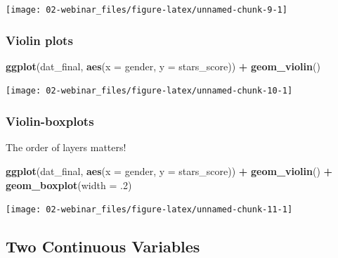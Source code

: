 \documentclass[
  oneside]{book}
\newenvironment{Shaded}{\begin{snugshade}}{\end{snugshade}}
\newcommand{\AttributeTok}[1]{\textcolor[rgb]{0.13,0.29,0.53}{#1}}
\newcommand{\DecValTok}[1]{\textcolor[rgb]{0.00,0.00,0.81}{#1}}
\newcommand{\FunctionTok}[1]{\textcolor[rgb]{0.13,0.29,0.53}{\textbf{#1}}}
\newcommand{\NormalTok}[1]{#1}
\newcommand{\SpecialCharTok}[1]{\textcolor[rgb]{0.81,0.36,0.00}{\textbf{#1}}}
\begin{document}
\begin{center}\texttt{[image: 02-webinar\_files/figure-latex/unnamed-chunk-9-1]} \end{center}

\subsubsection{Violin plots}\label{violin-plots}

\begin{Shaded}
\begin{Highlighting}[]
\FunctionTok{ggplot}\NormalTok{(dat\_final, }\FunctionTok{aes}\NormalTok{(}\AttributeTok{x =}\NormalTok{ gender, }\AttributeTok{y =}\NormalTok{ stars\_score)) }\SpecialCharTok{+}
  \FunctionTok{geom\_violin}\NormalTok{()}
\end{Highlighting}
\end{Shaded}

\begin{center}\texttt{[image: 02-webinar\_files/figure-latex/unnamed-chunk-10-1]} \end{center}

\subsubsection{Violin-boxplots}\label{violin-boxplots}

The order of layers matters!

\begin{Shaded}
\begin{Highlighting}[]
\FunctionTok{ggplot}\NormalTok{(dat\_final, }\FunctionTok{aes}\NormalTok{(}\AttributeTok{x =}\NormalTok{ gender, }\AttributeTok{y =}\NormalTok{ stars\_score)) }\SpecialCharTok{+}
  \FunctionTok{geom\_violin}\NormalTok{() }\SpecialCharTok{+}
  \FunctionTok{geom\_boxplot}\NormalTok{(}\AttributeTok{width =}\NormalTok{ .}\DecValTok{2}\NormalTok{)}
\end{Highlighting}
\end{Shaded}

\begin{center}\texttt{[image: 02-webinar\_files/figure-latex/unnamed-chunk-11-1]} \end{center}

\subsection{Two Continuous Variables}\label{two-continuous-variables}
\end{document}
